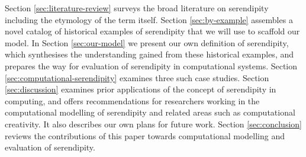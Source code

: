 Section \ref{sec:literature-review} surveys the broad literature on
serendipity including the etymology of the term itself.  Section
\ref{sec:by-example} assembles a novel catalog of historical examples
of serendipity that we will use to scaffold our model.  In Section
\ref{sec:our-model} we present our own definition of serendipity,
which synthesises the understanding gained from these historical
examples, and prepares the way for evaluation of serendipity in
computational systems.  Section \ref{sec:computational-serendipity}
examines three such case studies.  Section \ref{sec:discussion}
examines prior applications of the concept of serendipity in
computing, and offers recommendations for researchers working in the
computational modelling of serendipity and related areas such as
computational creativity.  It also describes our own plans for future
work.  Section \ref{sec:conclusion} reviews the contributions of this
paper towards computational modelling and evaluation of serendipity.


